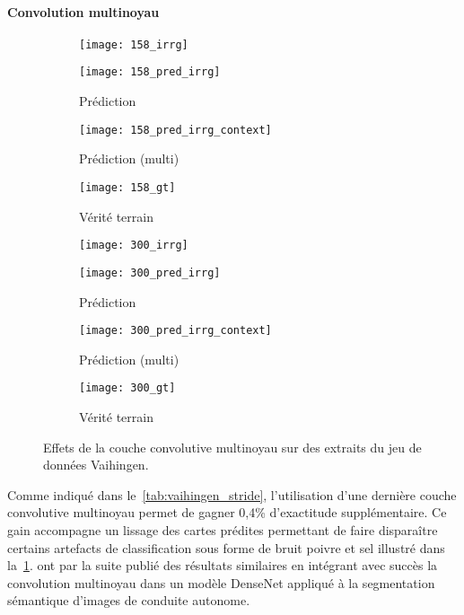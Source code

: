 \paragraph{Convolution multinoyau}
\begin{figure}[ht]
  \captionsetup[subfigure]{singlelinecheck=off,justification=centering}
  \captionsetup[subfigure]{labelformat=empty}
  \begin{subfigure}[t]{0.125\textwidth}
    \texttt{[image: 158\_irrg]}
    \caption{}
  \end{subfigure}%
  \begin{subfigure}[t]{0.125\textwidth}
    \texttt{[image: 158\_pred\_irrg]}
    \caption{Prédiction}
  \end{subfigure}%
  \begin{subfigure}[t]{0.125\textwidth}
    \texttt{[image: 158\_pred\_irrg\_context]}
    \caption{Prédiction (multi)}
  \end{subfigure}%
  \begin{subfigure}[t]{0.125\textwidth}
    \texttt{[image: 158\_gt]}
    \caption{Vérité terrain}
  \end{subfigure}%
	\begin{subfigure}[t]{0.125\textwidth}
		\texttt{[image: 300\_irrg]}
		\caption{}
	\end{subfigure}%
	\begin{subfigure}[t]{0.125\textwidth}
		\texttt{[image: 300\_pred\_irrg]}
		\caption{Prédiction}
	\end{subfigure}%
	\begin{subfigure}[t]{0.125\textwidth}
		\texttt{[image: 300\_pred\_irrg\_context]}
		\caption{Prédiction (multi)}
	\end{subfigure}%
	\begin{subfigure}[t]{0.125\textwidth}
		\texttt{[image: 300\_gt]}
		\caption{Vérité terrain}
	\end{subfigure}
  \caption[Effets de la couche convolutive multinoyau sur des extraits du jeu de données  Vaihingen.]{Effets de la couche convolutive multinoyau sur des extraits du jeu de données  Vaihingen.\\
	\isprslegende}
  \label{fig:patches_context}
\end{figure}

Comme indiqué dans le~\cref{tab:vaihingen_stride}, l'utilisation d'une dernière couche convolutive multinoyau permet de gagner 0,4\% d'exactitude supplémentaire. Ce gain accompagne un lissage des cartes prédites permettant de faire disparaître certains artefacts de classification sous forme de bruit poivre et sel illustré dans la~\cref{fig:patches_context}.
\citet{brahimi_multiscale_2018} ont par la suite publié des résultats similaires en intégrant avec succès la convolution multinoyau dans un modèle DenseNet appliqué à la segmentation sémantique d'images de conduite autonome.


